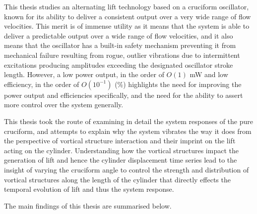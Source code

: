 \documentclass[oneside]{utmthesis}
\begin{document}
This thesis studies an alternating lift technology based on a cruciform oscillator, known for its ability to deliver a consistent output over a very wide range of flow velocities. This merit is of immense utility as it means that the system is able to deliver a predictable output over a wide range of flow velocities, and it also means that the oscillator has a built-in safety mechanism preventing it from mechanical failure resulting from rogue, outlier vibrations due to intermittent excitations producing amplitudes exceeding the designated oscillator stroke length. However, a low power output, in the order of $O(1)$ mW and low efficiency, in the order of $O(10^{-1})$ (\%) highlights the need for improving the power output and efficiencies specifically, and the need for the ability to assert more control over the system generally.

This thesis took the route of examining in detail the system responses of the pure cruciform, and attempts to explain why the system vibrates the way it does from the perspective of vortical structure interaction and their imprint on the lift acting on the cylinder. Understanding how the vortical structures impact the generation of lift and hence the cylinder displacement time series lead to the insight of varying the cruciform angle to control the strength and distribution of vortical structures along the length of the cylinder that directly effects the temporal evolution of lift and thus the system response.

\noindent The main findings of this thesis are summarised below.
\end{document}
